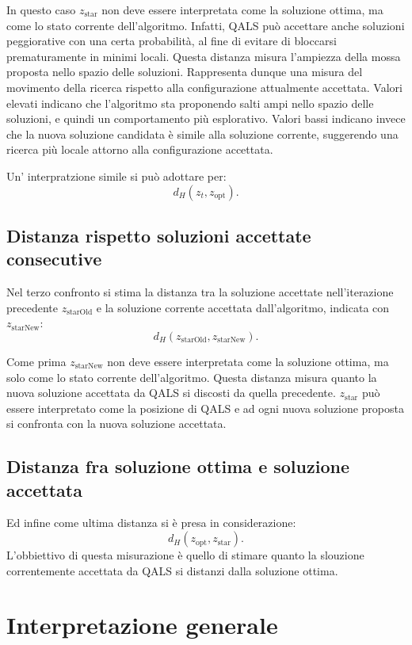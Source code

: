 \documentclass[a4paper,12pt]{article}
\begin{document}
In questo caso \(z_{\text{star}}\) non deve essere interpretata come la soluzione ottima, ma come lo stato corrente dell'algoritmo. Infatti, QALS può accettare anche soluzioni peggiorative con una certa probabilità, 
al fine di evitare di bloccarsi prematuramente in minimi locali.
Questa distanza misura l'ampiezza della mossa proposta nello spazio delle soluzioni. Rappresenta dunque una misura del movimento della ricerca rispetto alla configurazione attualmente accettata.
Valori elevati indicano che l'algoritmo sta proponendo salti ampi nello spazio delle soluzioni, e quindi un comportamento più esplorativo. Valori bassi indicano invece che la nuova soluzione candidata 
è simile alla soluzione corrente, suggerendo una ricerca più locale attorno alla configurazione accettata.

Un' interpratzione simile si può adottare per:
\[
d_H(z_t, z_{\text{opt}}).
\]

\subsection{Distanza rispetto soluzioni accettate consecutive}

Nel terzo confronto si stima la distanza tra la soluzione accettate nell'iterazione precedente \(z_{\text{starOld}}\) e la soluzione corrente accettata dall'algoritmo, indicata con \(z_{\text{starNew}}\):
\[
d_H(z_{\text{starOld}}, z_{\text{starNew}}).
\]

Come prima \(z_{\text{starNew}}\) non deve essere interpretata come la soluzione ottima, ma solo come lo stato corrente dell'algoritmo.
Questa distanza misura quanto la nuova soluzione accettata da QALS si discosti da quella precedente. \(z_{\text{star}}\) può essere interpretato come la posizione di QALS
e ad ogni nuova soluzione proposta si confronta con la nuova soluzione accettata.

\subsection{Distanza fra soluzione ottima e soluzione accettata}
Ed infine come ultima distanza si è presa in considerazione:
\[
d_H(z_{\text{opt}}, z_{\text{star}}).
\]
L'obbiettivo di questa misurazione è quello di stimare quanto la slouzione correntemente accettata da QALS
si distanzi dalla soluzione ottima. 

\section{Interpretazione generale}
\end{document}
